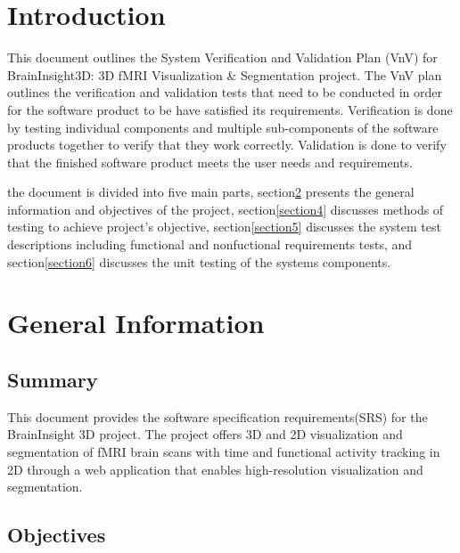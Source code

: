 \documentclass[12pt, titlepage]{article}
\begin{document}
\newpage


\section{Introduction}
This document outlines the System Verification and Validation Plan (VnV) for BrainInsight3D: 3D fMRI
Visualization \& Segmentation project. The VnV plan outlines the verification and validation tests
that need to be conducted in order for the software product to be have satisfied its requirements.
Verification is done by testing individual components and multiple sub-components of the software products together
to verify that they work correctly. Validation is done to verify that the finished software product meets the user
needs and requirements.

the document is divided into five main parts, section\ref{section3} presents the general information
and objectives of the project, section\ref{section4} discusses methods of testing to achieve project's
objective, section\ref{section5} discusses the system test descriptions including functional and nonfuctional
requirements tests, and section\ref{section6} discusses the unit testing of the systems components.



\section{General Information} \label{section3}

\subsection{Summary}

This document provides the software specification requirements(SRS) for the
BrainInsight 3D project. The project offers 3D and 2D visualization and segmentation
of fMRI brain scans with time and functional activity tracking in 2D through a
web application that enables high-resolution visualization and segmentation.




\subsection{Objectives}
\end{document}
